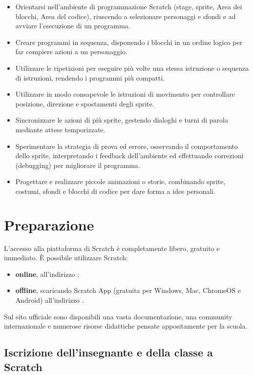 \begin{itemize}
\item
  Orientarsi nell'ambiente di programmazione Scratch (stage, sprite, Area dei blocchi, Area del codice), riuscendo a selezionare personaggi e sfondi e ad avviare l'esecuzione di un programma.
\item
  Creare programmi in sequenza, disponendo i blocchi in un ordine logico per far compiere azioni a un personaggio.
\item
  Utilizzare le ripetizioni per eseguire più volte una stessa istruzione o sequenza di istruzioni, rendendo i programmi più compatti.
\item
  Utilizzare in modo consapevole le istruzioni di movimento per controllare posizione, direzione e spostamenti degli sprite.
\item
  Sincronizzare le azioni di più sprite, gestendo dialoghi e turni di parola mediante attese temporizzate.
\item
  Sperimentare la strategia di prova ed errore, osservando il comportamento dello sprite, interpretando i feedback dell'ambiente ed effettuando correzioni (debugging) per migliorare il programma.
\item
  Progettare e realizzare piccole animazioni o storie, combinando sprite, costumi, sfondi e blocchi di codice per dare forma a idee personali.
\end{itemize}

\section{Preparazione }\label{preparazione-8}

L'accesso alla piattaforma di Scratch è completamente libero, gratuito e immediato. È possibile utilizzare Scratch:

\begin{itemize}
\item
  \textbf{online}, all'indirizzo ;
\item
  \textbf{offline}, scaricando Scratch App (gratuita per Windows, Mac, ChromeOS e Android) all'indirizzo .
\end{itemize}

Sul sito ufficiale sono disponibili una vasta documentazione, una community internazionale e numerose risorse didattiche pensate appositamente per la scuola.

\subsection{Iscrizione dell'insegnante e della classe a Scratch }\label{iscrizione-dellinsegnante-e-della-classe-a-scratch}


